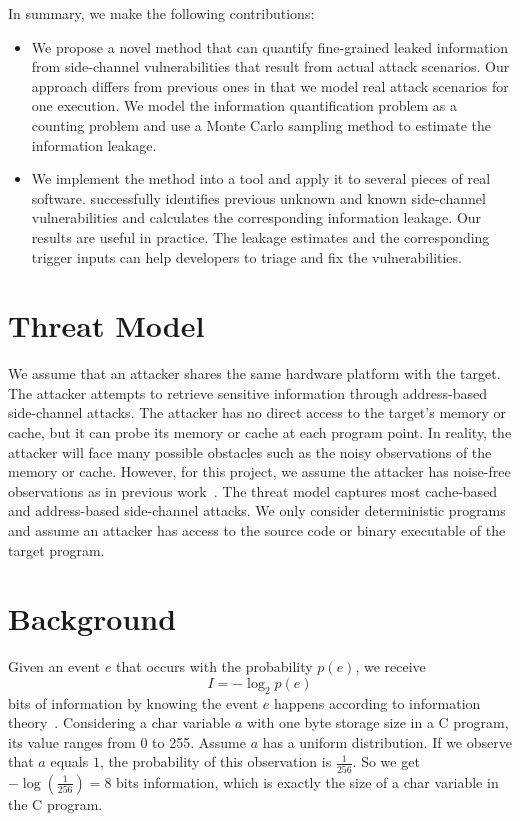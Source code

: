 In summary, we make the following contributions:

\begin{itemize}
      \item We propose a novel method that can quantify fine-grained leaked
            information from side-channel vulnerabilities that result from actual attack
            scenarios. Our approach differs from previous ones in that we
            model real attack scenarios for one execution. 
            We model the information quantification problem as a counting problem 
            and use a Monte Carlo sampling method to estimate the information leakage.
   
      \item We implement the method into a tool and apply it
            to several pieces of real software. \tool{} successfully identifies
            previous unknown and known side-channel vulnerabilities and calculates the corresponding information leakage. 
            Our results are useful in practice.
            The leakage estimates and the corresponding trigger inputs can 
            help developers to triage and fix the vulnerabilities.
\end{itemize}

\section{Threat Model}

We assume that an attacker shares the same hardware platform with the target.
The attacker attempts to retrieve sensitive information through address-based
side-channel attacks. The attacker has no direct access to the target's memory or cache,
but it can probe its memory or cache at each program point. In reality, the
attacker will face many possible obstacles such as the noisy observations 
of the memory or cache. However, for this project, we assume
the attacker has noise-free observations as in previous work~\cite{203878,182946,Brotzman19Casym}. 
The threat model captures most cache-based and address-based side-channel attacks. 
We only consider deterministic programs and assume an attacker 
has access to the source code or binary executable of the target program.


\section{Background}
Given an event $e$ that occurs with the probability $p(e)$, we receive
\begin{displaymath}
    I = - \log_2p(e)
\end{displaymath}
bits of information by knowing the event $e$ happens according to information theory~\cite{shannon1948mathematical}. 
Considering a char variable $a$
with one byte storage size in a C program, its value ranges from 0 to 255.
Assume $a$ has a uniform distribution. If we observe that
$a$ equals $1$, the probability of this observation is $\frac{1}{256}$. So 
we get $-\log(\frac{1}{256}) = 8$ bits information, which is exactly the size
of a char variable in the C program.

